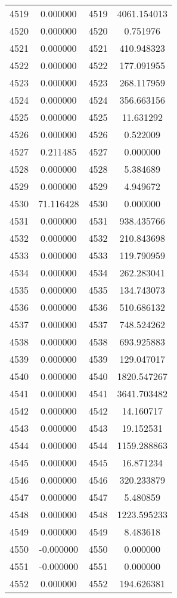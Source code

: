 \documentclass[12pt]{article}
\begin{document}
\begin{longtable}{@{}cccc@{}}
4519 & 0.000000 & 4519 & 4061.154013 \\
4520 & 0.000000 & 4520 & 0.751976 \\
4521 & 0.000000 & 4521 & 410.948323 \\
4522 & 0.000000 & 4522 & 177.091955 \\
4523 & 0.000000 & 4523 & 268.117959 \\
4524 & 0.000000 & 4524 & 356.663156 \\
4525 & 0.000000 & 4525 & 11.631292 \\
4526 & 0.000000 & 4526 & 0.522009 \\
4527 & 0.211485 & 4527 & 0.000000 \\
4528 & 0.000000 & 4528 & 5.384689 \\
4529 & 0.000000 & 4529 & 4.949672 \\
4530 & 71.116428 & 4530 & 0.000000 \\
4531 & 0.000000 & 4531 & 938.435766 \\
4532 & 0.000000 & 4532 & 210.843698 \\
4533 & 0.000000 & 4533 & 119.790959 \\
4534 & 0.000000 & 4534 & 262.283041 \\
4535 & 0.000000 & 4535 & 134.743073 \\
4536 & 0.000000 & 4536 & 510.686132 \\
4537 & 0.000000 & 4537 & 748.524262 \\
4538 & 0.000000 & 4538 & 693.925883 \\
4539 & 0.000000 & 4539 & 129.047017 \\
4540 & 0.000000 & 4540 & 1820.547267 \\
4541 & 0.000000 & 4541 & 3641.703482 \\
4542 & 0.000000 & 4542 & 14.160717 \\
4543 & 0.000000 & 4543 & 19.152531 \\
4544 & 0.000000 & 4544 & 1159.288863 \\
4545 & 0.000000 & 4545 & 16.871234 \\
4546 & 0.000000 & 4546 & 320.233879 \\
4547 & 0.000000 & 4547 & 5.480859 \\
4548 & 0.000000 & 4548 & 1223.595233 \\
4549 & 0.000000 & 4549 & 8.483618 \\
4550 & -0.000000 & 4550 & 0.000000 \\
4551 & -0.000000 & 4551 & 0.000000 \\
4552 & 0.000000 & 4552 & 194.626381 \\

\end{longtable}
\end{document}
